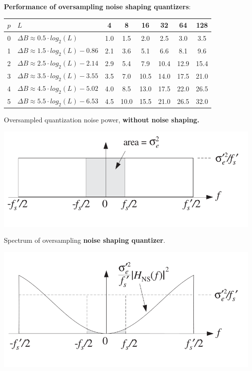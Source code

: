 \textbf{Performance of oversampling noise shaping quantizers}:

\vspace{0.2cm}
\begin{tabularx}{0.65\textwidth}{|c|X|c|c|c|c|c|c|}
	\hline
	$p$	& $L$							& 4		& 8		& 16	& 32	& 64	& 128
	\\ \hline
	0	& $\Delta B \approx 0.5 \cdot log_2(L)$		& 1.0	& 1.5	& 2.0	& 2.5	& 3.0	& 3.5 \\
	1	& $\Delta B \approx 1.5 \cdot log_2(L) - 0.86$ & 2.1	& 3.6	& 5.1	& 6.6	& 8.1	& 9.6 \\
	2	& $\Delta B \approx 2.5 \cdot log_2(L) - 2.14$	& 2.9	& 5.4	& 7.9	& 10.4	& 12.9	& 15.4 \\
	3	& $\Delta B \approx 3.5 \cdot log_2(L) - 3.55$	& 3.5	& 7.0	& 10.5	& 14.0	& 17.5	& 21.0 \\
	4	& $\Delta B \approx 4.5 \cdot log_2(L) - 5.02$	& 4.0	& 8.5	& 13.0	& 17.5	& 22.0	& 26.5 \\
	5	& $\Delta B \approx 5.5 \cdot log_2(L) - 6.53$	& 4.5	& 10.0	& 15.5	& 21.0	& 26.5	& 32.0 \\
	\hline
\end{tabularx}
\resetArrayStretch

\vspace{0.2cm}
\begin{minipage}{0.3\textwidth}
  Oversampled quantization noise power, \textbf{without noise shaping.}
  
  \includegraphics[width=\textwidth]{./picture/no_noise_shaping}
\end{minipage}
\hspace{0.1\textwidth}
\begin{minipage}{0.3\textwidth}
  Spectrum of oversampling \textbf{noise shaping quantizer}.
  
  \includegraphics[width=\textwidth]{./picture/noise_shaping}
\end{minipage}


